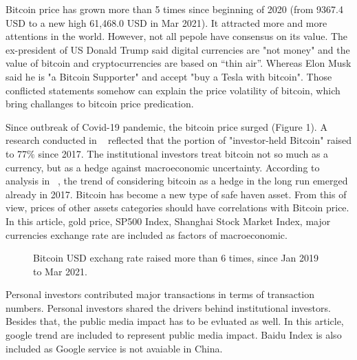 \documentclass[10pt,twocolumn,letterpaper]{article}
\begin{document}
Bitcoin price has grown more than 5 times since beginning of 2020 (from 9367.4 USD to a new high 61,468.0 USD in Mar 2021). It 
attracted more and more attentions in the world. However, not all pepole have consensus on its value. The ex-president of US Donald Trump 
said digital currencies are "not money" and the value of bitcoin and cryptocurrencies are based on “thin air”. Whereas Elon Musk 
said he is "a Bitcoin Supporter" and accept "buy a Tesla with bitcoin". Those conflicted statements somehow can explain the price 
volatility of bitcoin, which bring challanges to bitcoin price predication.

Since outbreak of Covid-19 pandemic, the bitcoin price surged (Figure 1). A research conducted in ~\cite{Authors01} reflected 
that the portion of "investor-held Bitcoin" raised to 77$\%$ since 2017. The institutional investors treat bitcoin not so much 
as a currency, but as a hedge against macroeconomic uncertainty. According to analysis in ~\cite{Authors02}, 
the trend of considering bitcoin as a hedge in the long run emerged already in 2017. Bitcoin has become a new type of safe haven asset. From this 
of view, prices of other assets categories should have correlations with Bitcoin price. In this article, gold price, SP500 Index, Shanghai Stock 
Market Index, major currencies exchange rate are included as factors of macroeconomic.

\begin{figure}[htb]
\begin{center}

\end{center}
   \caption{Bitcoin USD exchang rate raised more than 6 times, since Jan 2019 to Mar 2021.}
\label{fig:long}
\label{fig:onecol}
\end{figure}

Personal investors contributed major transactions in terms of transaction numbers. Personal investors shared the drivers behind institutional investors. Besides that, 
the public media impact has to be evluated as well. In this article, google trend are included to represent public media impact.  Baidu Index is also included as Google 
service is not avaiable in China.
\end{document}

